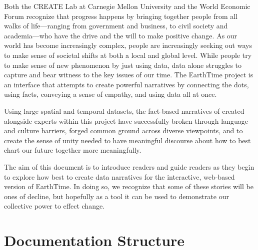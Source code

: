 \documentclass[
]{krantz}
\begin{document}
Both the CREATE Lab at Carnegie Mellon University and the World Economic Forum recognize that progress happens by bringing together people from all walks of life---ranging from government and business, to civil society and academia---who have the drive and the will to make positive change. As our world has become increasingly complex, people are increasingly seeking out ways to make sense of societal shifts at both a local and global level. While people try to make sense of new phenomenon by just using data, data alone struggles to capture and bear witness to the key issues of our time. The EarthTime project is an interface that attempts to create powerful narratives by connecting the dots, using facts, conveying a sense of empathy, and using data all at once.

Using large spatial and temporal datasets, the fact-based narratives of created alongside experts within this project have successfully broken through language and culture barriers, forged common ground across diverse viewpoints, and to create the sense of unity needed to have meaningful discourse about how to best chart our future together more meaningfully.

The aim of this document is to introduce readers and guide readers as they begin to explore how best to create data narratives for the interactive, web-based version of EarthTime. In doing so, we recognize that some of these stories will be ones of decline, but hopefully as a tool it can be used to demonstrate our collective power to effect change.

\hypertarget{documentation-structure}{%
\section*{Documentation Structure}\label{documentation-structure}}
\end{document}

